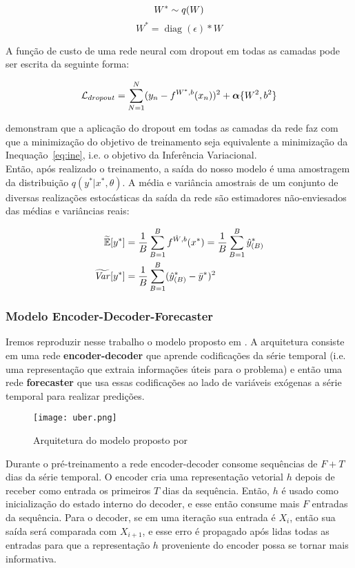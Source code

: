 \newcommand{\diag}{\mathop{\mathrm{diag}}}

$$    W^*   \sim \mathnormal{q}(W) $$
$$    W^*  = \diag(\epsilon) * W $$


A função de custo de uma rede neural com dropout em todas as camadas pode ser escrita da seguinte forma:

\[     \mathcal{L}_{dropout} = \sum^N_{N=1} (y_n - \mathnormal{f}^{W^*,b}(x_n))^2 + \boldsymbol{\alpha}\{W^2,b^2\} \]


\citep{dropbayes} demonstram que a aplicação do dropout em todas as camadas da rede faz com que a minimização
do objetivo de treinamento seja equivalente a minimização da Inequação~\ref{eq:ine}, i.e. o objetivo da Inferência Variacional.\\

Então, após realizado o treinamento, a saída do nosso modelo é uma amostragem da distribuição $q(y^* | x^* , \theta)$.
A média e variância amostrais de um conjunto de diversas realizações estocásticas da saída da rede são estimadores não-enviesados das médias e variâncias reais:

\begin{align*}
  \label{eq:aproxs}
  \widetilde{\mathbb{E}}[y^*] &=
   \frac{1}{B}\sum^B_{B=1}\mathnormal{f}^{\hat{W},b}(x^*) = \frac{1}{B}\sum^B_{B=1}\hat{y}^*_{(B)}\\ 
   \widetilde{\mathit{Var}}[y^*]  &= \frac{1}{B}\sum^B_{B=1}(\hat{y}^*_{(B)} - \bar{y}^*)^2 
 \end{align*}

\subsubsection{Modelo Encoder-Decoder-Forecaster}

Iremos reproduzir nesse trabalho o modelo proposto em \citep{ubertime}. A
arquitetura consiste em uma rede \textbf{encoder-decoder} que aprende codificações da
série temporal (i.e. uma representação que extraia informações úteis para o
problema) e então uma rede \textbf{forecaster} que usa essas codificações ao lado de
variáveis exógenas a série temporal para realizar predições.  


\begin{figure}[H]
\centering
\texttt{[image: uber.png]}
\caption{Arquitetura do modelo proposto por \citep{ubertime}}
\end{figure}


Durante o pré-treinamento a rede encoder-decoder consome sequências de $F + T$ dias
da série temporal. O encoder cria uma representação vetorial $h$ depois de
receber como entrada os primeiros $T$ dias da sequência. Então, $h$ é usado como
inicialização do estado interno do decoder, e esse então consume mais $F$
entradas da sequência. Para o decoder, se em uma iteração sua entrada é $X_i$,
então sua saída será comparada com $X_{i+1}$, e esse erro é propagado após lidas
todas as entradas para que a representação $h$ proveniente do encoder possa se
tornar mais informativa.


